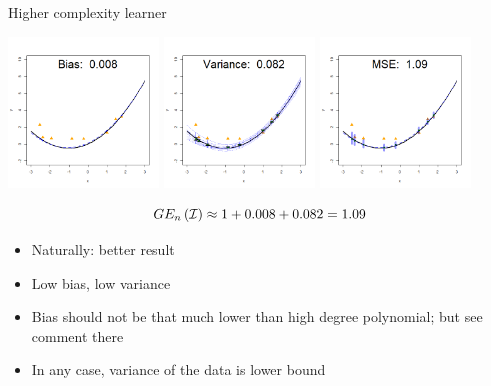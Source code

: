 \documentclass[11pt,compress,t,notes=noshow, xcolor=table]{beamer}
\begin{document}
\begin{vbframe} {Higher complexity learner}
\begin{center}
  \includegraphics[width = 0.3\textwidth]{figure/bias_variance_decomposition-correct_model_bias.png}
  \includegraphics[width = 0.3\textwidth]{figure/bias_variance_decomposition-correct_model_variance.png}
  \includegraphics[width = 0.3\textwidth]{figure/bias_variance_decomposition-correct_model_mse.png}
\end{center}

$$GE_n\left(\mathcal{I}\right) \approx 1 + 0.008 + 0.082 = 1.09 $$

\begin{itemize}
  \item Naturally: better result
  \item Low bias, low variance
  \item Bias should not be that much lower than
  high degree polynomial; but see comment there
  \item In any case, variance of the data is lower bound
\end{itemize}
 

\end{vbframe}


\endlecture
\end{document}
